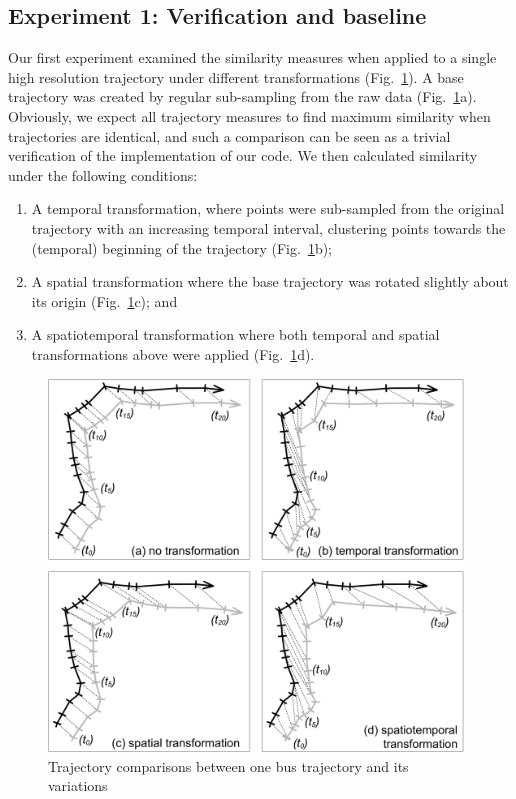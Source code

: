 \documentclass{interact}
\begin{document}
\subsection{Experiment 1: Verification and baseline}
\label{par:experiment_1}
Our first experiment examined the similarity measures when applied to a single high resolution trajectory under different transformations (Fig.~\ref{fig:sample bus}). A base trajectory was created by regular sub-sampling from the raw data (Fig.~\ref{fig:sample bus}a). Obviously, we expect all trajectory measures to find maximum similarity when trajectories are identical, and such a comparison can be seen as a trivial verification of the implementation of our code.  We then calculated similarity under the following conditions:

\begin{enumerate}
\item A temporal transformation, where points were sub-sampled from the original trajectory with an increasing temporal interval, clustering points towards the (temporal) beginning of the trajectory (Fig.~\ref{fig:sample bus}b);
\item A spatial transformation where the base trajectory was rotated slightly about its origin (Fig.~\ref{fig:sample bus}c); and
\item A spatiotemporal transformation where both temporal and spatial transformations  above were applied (Fig.~\ref{fig:sample bus}d).
\end{enumerate}

\begin{figure}[ht]
	 \centering
	 \includegraphics[width=110mm]{figures/trajectoryComparisons_V3}
\caption{Trajectory comparisons between one bus trajectory and its variations}
\label{fig:sample bus}	
\end{figure}
\end{document}

